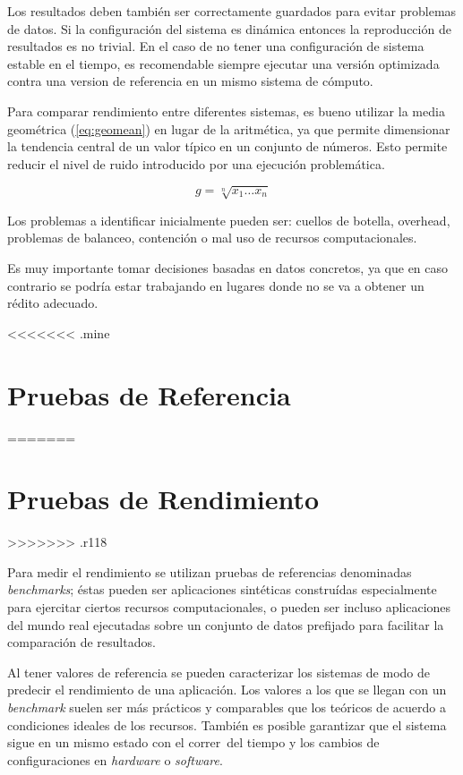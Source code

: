 \documentclass[a4paper]{report}
\begin{document}
Los resultados deben tambi\'en ser correctamente guardados para evitar
problemas de datos. Si la configuraci\'on del sistema es din\'amica entonces la
reproducci\'on de resultados es no trivial. En el caso de no tener una
configuraci\'on de sistema estable en el tiempo, es recomendable siempre
ejecutar una versi\'on optimizada contra una version de referencia en un mismo
sistema de c\'omputo.

\bigskip

Para comparar rendimiento entre diferentes sistemas, es bueno utilizar
la media geom\'etrica (\ref{eq:geomean}) en lugar de la aritm\'etica,
ya que permite dimensionar la tendencia central de un valor t\'ipico en un conjunto
de n\'umeros. Esto permite reducir el nivel de ruido introducido por una ejecuci\'on
problem\'atica.

\begin{equation}
\label{eq:geomean}
g = \sqrt[n]{x_{1} \ldots x_{n}}
\end{equation}

\bigskip

Los problemas a identificar inicialmente pueden ser: cuellos de botella,
overhead, problemas de balanceo, contenci\'on o mal uso de recursos
computacionales.

\bigskip

Es muy importante tomar decisiones basadas en datos concretos, ya que en
caso contrario se podr\'ia estar trabajando en lugares donde no se va a obtener
un r\'edito adecuado.

<<<<<<< .mine
\section{Pruebas de Referencia}
=======
\section{Pruebas de Rendimiento}
>>>>>>> .r118

Para medir el rendimiento se utilizan pruebas de referencias denominadas
{\em benchmarks}; \'estas pueden ser aplicaciones sint\'eticas constru\'idas
especialmente para ejercitar ciertos recursos computacionales, o pueden ser incluso
aplicaciones del mundo real ejecutadas sobre un conjunto de datos prefijado para
facilitar la comparaci\'on de resultados.

\bigskip

Al tener valores de referencia se pueden caracterizar los sistemas de modo de predecir el rendimiento de una aplicaci\'on.
Los valores a los que se llegan con un {\it benchmark} suelen ser m\'as pr\'acticos y
comparables que los te\'oricos de acuerdo a condiciones ideales de los recursos.
Tambi\'en es posible garantizar que el sistema sigue en un mismo estado con el correr\
del tiempo y los cambios de configuraciones en {\it hardware} o {\it software}.
\end{document}
